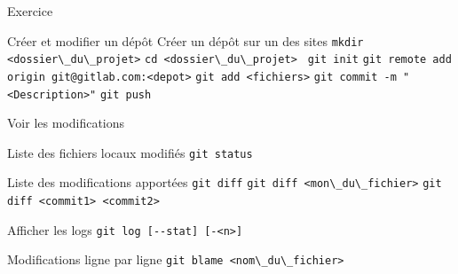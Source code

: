 \documentclass{beamer}
\begin{document}
\begin{frame}[fragile]{Exercice}
  \begin{exampleblock}{Créer et modifier un dépôt}
    Créer un dépôt sur un des sites\linebreak
    \textcolor{commandcolor}{\verb?mkdir <dossier\_du\_projet>?}\linebreak
    \textcolor{commandcolor}{\verb?cd <dossier\_du\_projet> ?}\linebreak
    \textcolor{commandcolor}{\verb?git init?}\linebreak
    \textcolor{commandcolor}{\verb?git remote add origin git@gitlab.com:<depot>?}\linebreak
    \linebreak
    \textcolor{commandcolor}{\verb?git add <fichiers>?}\linebreak
    \textcolor{commandcolor}{\verb?git commit -m "<Description>"?}\linebreak
    \textcolor{commandcolor}{\verb?git push?}
  \end{exampleblock}
\end{frame}


\begin{frame}[fragile]{Voir les modifications}
  \begin{block}{Liste des fichiers locaux modifiés}
    \textcolor{commandcolor}{\verb?git status?}
  \end{block}
  \begin{block}{Liste des modifications apportées}
    \textcolor{commandcolor}{\verb?git diff?}\linebreak
    \textcolor{commandcolor}{\verb?git diff <mon\_du\_fichier>?}\linebreak
    \textcolor{commandcolor}{\verb?git diff <commit1> <commit2>?}
  \end{block}
  \begin{block}{Afficher les logs}
    \textcolor{commandcolor}{\verb?git log [--stat] [-<n>]?}
  \end{block}
  \begin{block}{Modifications ligne par ligne}
    \textcolor{commandcolor}{\verb?git blame <nom\_du\_fichier>?}
  \end{block}
\end{frame}
\end{document}
